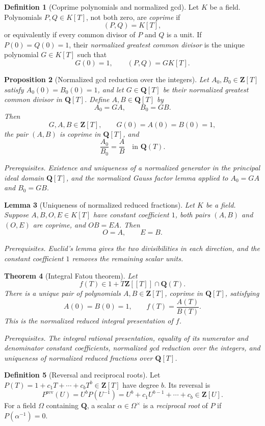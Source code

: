 \documentclass[10pt]{article}
\newtheorem{theorem}{Theorem}[section]
\newtheorem{proposition}[theorem]{Proposition}
\newtheorem{lemma}[theorem]{Lemma}
\theoremstyle{definition}
\newtheorem{definition}[theorem]{Definition}
\newcommand{\deps}[1]{\par\smallskip\noindent\textit{Prerequisites.} #1}
\begin{document}
\begin{definition}[Coprime polynomials and normalized gcd]
Let \(K\) be a field.  Polynomials \(P,Q\in K[T]\), not both zero, are
\emph{coprime} if
\[
 (P,Q)=K[T],
\]
or equivalently if every common divisor of \(P\) and \(Q\) is a unit.  If
\(P(0)=Q(0)=1\), their \emph{normalized greatest common divisor} is the
unique polynomial \(G\in K[T]\) such that
\[
 G(0)=1,
 \qquad
 (P,Q)=G K[T].
\]
\end{definition}

\begin{proposition}[Normalized gcd reduction over the integers]
Let \(A_0,B_0\in\mathbf Z[T]\) satisfy
\(A_0(0)=B_0(0)=1\), and let \(G\in\mathbf Q[T]\) be their normalized
greatest common divisor in \(\mathbf Q[T]\).  Define
\(A,B\in\mathbf Q[T]\) by
\[
 A_0=GA,
 \qquad
 B_0=GB.
\]
Then
\[
 G,A,B\in\mathbf Z[T],
 \qquad
 G(0)=A(0)=B(0)=1,
\]
the pair \((A,B)\) is coprime in \(\mathbf Q[T]\), and
\[
 \frac{A_0}{B_0}=\frac{A}{B}
 \quad\text{in }\mathbf Q(T).
\]
\deps{Existence and uniqueness of a normalized generator in the principal
ideal domain \(\mathbf Q[T]\), and the normalized Gauss factor lemma applied
to \(A_0=GA\) and \(B_0=GB\).}
\end{proposition}

\begin{lemma}[Uniqueness of normalized reduced fractions]
Let \(K\) be a field.  Suppose \(A,B,O,E\in K[T]\) have constant
coefficient \(1\), both pairs \((A,B)\) and \((O,E)\) are coprime, and
\(OB=EA\).  Then
\[
 O=A,
 \qquad
 E=B.
\]
\deps{Euclid's lemma gives the two divisibilities in each direction, and
the constant coefficient \(1\) removes the remaining scalar units.}
\end{lemma}

\begin{theorem}[Integral Fatou theorem]
Let
\[
 f(T)\in1+T\mathbf Z[[T]]\cap\mathbf Q(T).
\]
There is a unique pair of polynomials \(A,B\in\mathbf Z[T]\), coprime in
\(\mathbf Q[T]\),
satisfying
\[
 A(0)=B(0)=1,
 \qquad f(T)=\frac{A(T)}{B(T)}.
\]
This is the normalized reduced integral presentation of \(f\).
\deps{The integral rational presentation, equality of its numerator and
denominator constant coefficients, normalized gcd reduction over the
integers, and uniqueness of normalized reduced fractions over
\(\mathbf Q[T]\).}
\end{theorem}

\begin{definition}[Reversal and reciprocal roots]
Let \(P(T)=1+c_1T+\cdots+c_bT^b\in\mathbf Z[T]\) have degree \(b\).  Its
reversal is
\[
 P^{\mathrm{rev}}(U)=U^bP(U^{-1})
 =U^b+c_1U^{b-1}+\cdots+c_b\in\mathbf Z[U].
\]
For a field \(\Omega\) containing \(\mathbf Q\), a scalar
\(\alpha\in\Omega^\times\) is a \emph{reciprocal root} of \(P\) if
\(P(\alpha^{-1})=0\).
\end{definition}
\end{document}
